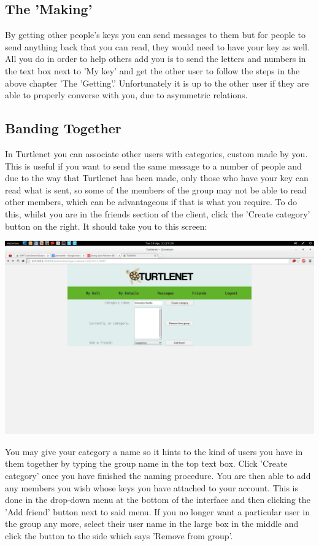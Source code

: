\subsection{The 'Making'}
By getting other people's keys you can send messages to them but for people to
send anything back that you can read, they would need to have your key as well.
All you do in order to help others add you is to send the letters and numbers
in the text box next to 'My key' and get the other user to follow the steps in
the above chapter 'The 'Getting'.'  Unfortunately it is up to the other user if
they are able to properly converse with you, due to asymmetric relations.

\subsection{Banding Together}
In Turtlenet you can associate other users with categories, custom made by you.
This is useful if you want to send the same message to a number of people and
due to the way that Turtlenet has been made, only those who have your key can
read what is sent, so some of the members of the group may not be able to read
other members, which can be advantageous if that is what you require.
To do this, whilst you are in the friends section of the client, click the 
'Create category' button on the right.  It should take you to this screen:

\includegraphics[scale=0.2]{../Screenshots/new6}

You may give your category a name so it hints to the kind of users you have in
them together by typing the group name in the top text box.  Click 'Create
category' once you have finished the naming procedure.  You are then able to add
any members you wish whose keys you have attached to your account.  This is done
in the drop-down menu at the bottom of the interface and then clicking the 'Add
friend' button next to said menu.  If you no longer want a particular user in
the group any more, select their user name in the large box in the middle and
click the button to the side which says 'Remove from group'.

